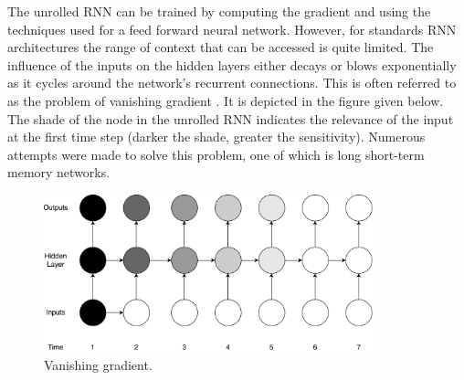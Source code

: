 The unrolled RNN can be trained by computing the gradient and using the techniques used for a feed forward neural network. However, for standards RNN architectures the range of context that can be accessed is quite limited. The influence of the inputs on the hidden layers either decays or blows exponentially as it cycles around the network's recurrent connections. This is often referred to as the problem of vanishing gradient \cite{hochreiter1998vanishing}. It is depicted in the figure given below. The shade of the node in the unrolled RNN indicates the relevance of the input at the first time step (darker the shade, greater the sensitivity). Numerous attempts were made to solve this problem, one of which is long short-term memory networks. 
\begin{figure}[!h]
	\centering
	\includegraphics[width=0.85\textwidth]{Pictures/vanishing-grad.png}
	\hspace{1mm}
	\caption{Vanishing gradient.} 
	\label{fig:err-surf}
\end{figure}

